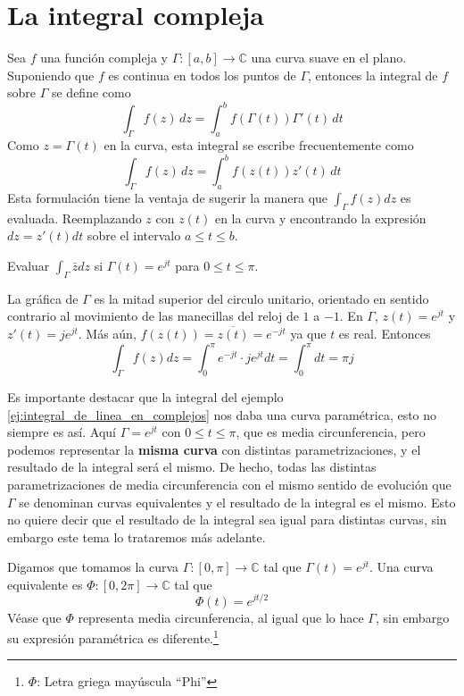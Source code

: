 \section{La integral compleja}

\begin{definition}
Sea $f$ una función compleja y $\Gamma:[a,b]\to\mathbb{C}$ una curva suave en el plano. Suponiendo que $f$ es continua en todos los puntos de $\Gamma$, entonces la integral de $f$ sobre $\Gamma$ se define como
$$
\int_\Gamma f(z)\,dz = \int_a^b f(\Gamma(t))\Gamma'(t)\,dt
$$
Como $z=\Gamma(t)$ en la curva, esta integral se escribe frecuentemente como
\begin{equation}
\int_\Gamma f(z)\,dz = \int_a^b f(z(t))z'(t)\,dt
\label{eq:definicion_de_integral_compleja}
\end{equation}
Esta formulación tiene la ventaja de sugerir la manera que $\int_\Gamma f(z)dz$ es evaluada. Reemplazando $z$ con $z(t)$ en la curva y encontrando la expresión $dz=z'(t)dt$ sobre el intervalo $a\leqslant t\leqslant b$. 
\end{definition}

\begin{example}
  Evaluar $\int_\Gamma \bar{z} dz$ si $\Gamma(t)=e^{jt}$ para $0\leqslant t\leqslant \pi$.

  La gráfica de $\Gamma$ es la mitad superior del circulo unitario, orientado en sentido contrario al movimiento de las manecillas del reloj de $1$ a $-1$. En $\Gamma$, $z(t)=e^{jt}$ y $z'(t)=je^{jt}$. Más aún, $f(z(t))=\overline{z(t)}=e^{-jt}$ ya que $t$ es real. Entonces 
  $$
  \int_\Gamma f(z)dz=\int_0^\pi e^{-jt}\cdot je^{jt}dt=\int_0^\pi dt = \pi j
  $$
  \label{ej:integral_de_linea_en_complejos}
\end{example}

Es importante destacar que la integral del ejemplo \ref{ej:integral_de_linea_en_complejos} nos daba una curva paramétrica, esto no siempre es así. Aquí $\Gamma=e^{jt}$ con $0\leqslant t \leqslant \pi$, que es media circunferencia, pero podemos representar la \textbf{misma curva} con distintas parametrizaciones, y el resultado de la integral será el mismo. De hecho, todas las distintas parametrizaciones de media circunferencia con el mismo sentido de evolución que $\Gamma$ se denominan curvas equivalentes y el resultado de la integral es el mismo. Esto no quiere decir que el resultado de la integral sea igual para distintas curvas, sin embargo este tema lo trataremos más adelante.

\begin{example}
  Digamos que tomamos la curva $\Gamma:[0,\pi]\to \mathbb{C}$ tal que $\Gamma(t)=e^{jt}$. Una curva equivalente es $\Phi:[0,2\pi]\to\mathbb{C}$ tal que
  $$
  \Phi(t)=e^{jt/2}
  $$
  Véase que $\Phi$ representa media circunferencia, al igual que lo hace $\Gamma$, sin embargo su expresión paramétrica es diferente.\footnote{$\Phi$: Letra griega mayúscula ``Phi''}
\end{example}

